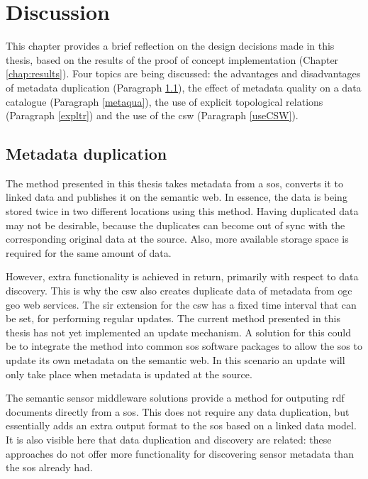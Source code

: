 
\chapter{Discussion}
\label{chap:disc}

This chapter provides a brief reflection on the design decisions made in this thesis, based on the  results of the proof of concept implementation (Chapter \ref{chap:results}). Four topics are being discussed: the advantages and disadvantages of metadata duplication (Paragraph \ref{metadup}), the effect of metadata quality on a data catalogue (Paragraph \ref{metaqua}), the use of explicit topological relations (Paragraph \ref{expltr}) and the use of the \acf{csw} (Paragraph \ref{useCSW}).

\section{Metadata duplication}
\label{metadup}
The method presented in this thesis takes metadata from a \ac{sos}, converts it to linked data and publishes it on the semantic web. In essence, the data is being stored twice in two different locations using this method. Having duplicated data  may not be desirable, because the duplicates can become out of sync with the corresponding original data at the source. Also, more available storage space is required for the same amount of data. 

However, extra functionality is achieved in return, primarily with respect to data discovery. This is why the \ac{csw} also creates duplicate data of metadata from \ac{ogc} geo web services. The \ac{sir} extension for the \ac{csw} has a fixed time interval that can be set, for performing regular updates. The current method presented in this thesis has not yet implemented an update mechanism. A solution for this could be to integrate the method into common \ac{sos} software packages to allow the \ac{sos} to update its own metadata on the semantic web. In this scenario an update will only take place when metadata is updated at the source.

The semantic sensor middleware solutions provide a method for outputing \ac{rdf} documents directly from a \ac{sos}. This does not require any data duplication, but essentially adds an extra output format to the \ac{sos} based on a linked data model. It is also visible here that data duplication and discovery are related: these approaches do not offer more functionality for discovering sensor metadata than the \ac{sos} already had.       


